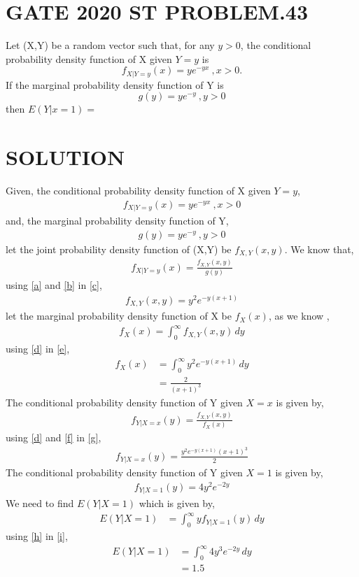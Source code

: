 \documentclass[journal,12pt,twocolumn]{IEEEtran}
\begin{document}
\section{GATE 2020 ST PROBLEM.43}
Let (X,Y) be a random vector such that, for any $y>0$, the conditional probability density function of X given $Y=y$ is $$f_{X|Y=y}(x)=ye^{-yx} \:,x>0. $$ If the marginal probability density function of Y is $$g(y)=ye^{-y}\:,y>0$$ then $E(Y|x=1)=$
\section{SOLUTION}
Given,
the conditional probability density function of X given $Y=y$,
\begin{align}
f_{X|Y=y}(x)=ye^{-yx} \:,x>0 \label{a}
\end{align}
and, the marginal probability density function of Y,
\begin{align}
g(y)=ye^{-y}\:,y>0 \label{b}
\end{align}
let the joint probability density function of (X,Y) be $f_{X,Y}(x,y)$.
We know that,
\begin{align}
f_{X|Y=y}(x)=\frac{f_{X,Y}(x,y)}{g(y)}  \label{c}
\end{align}
using \eqref{a} and \eqref{b} in \eqref{c},
\begin{align}
f_{X,Y}(x,y) =y^{2}e^{-y(x+1)} \label{d}
\end{align}
let the marginal probability density function of X be $f_{X}(x)$,
as we know ,
\begin{align}
f_{X}(x)= \int_{0}^{\infty}{f_{X,Y}(x,y)}\,dy \label{e}
\end{align}
using \eqref{d} in \eqref{e},
\begin{align}
f_{X}(x) &=\int_{0}^{\infty}{y^{2}e^{-y(x+1)}}\,dy\\
&=\frac{2}{(x+1)^{3}} \label{f}
\end{align}
The conditional probability density function of Y given $X=x$ is given by,
\begin{align}
f_{Y|X=x}(y) =\frac{f_{X,Y}(x,y)}{f_{X}(x)} \label{g}
\end{align}
using \eqref{d} and \eqref{f} in \eqref{g},
\begin{align}
 f_{Y|X=x}(y) =\frac{y^{2}e^{-y(x+1)}(x+1)^{3}}{2} 
\end{align}
The conditional probability density function of Y given $X=1$ is given by,
\begin{align}
 f_{Y|X=1}(y) =4y^{2}e^{-2y} \label{h}
\end{align}
We need to find $E(Y|X=1)$ which is given by,
\begin{align}
 E(Y|X=1) &= \int_{0}^{\infty}{yf_{Y|X=1}(y)}\,dy \label{i}
\end{align}
using \eqref{h} in \eqref{i},
\begin{align}
E(Y|X=1) &= \int_{0}^{\infty}{4y^{3}e^{-2y}}\,dy\\
        &=1.5
\end{align}
\end{document}
